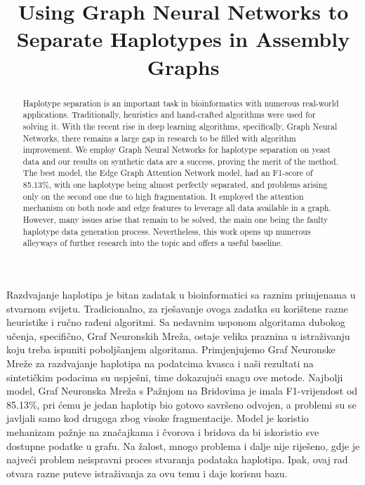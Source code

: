 \documentclass[times, utf8, diplomski, english]{fer_eng}
\begin{document}
\title{Using Graph Neural Networks to Separate Haplotypes in Assembly Graphs}
\begin{abstract}
	
Haplotype separation is an important task in bioinformatics with numerous real-world applications. Traditionally, heuristics and hand-crafted algorithms were used for solving it. With the recent rise in deep learning algorithms, specifically, Graph Neural Networks, there remains a large gap in research to be filled with algorithm improvement. We employ Graph Neural Networks for haplotype separation on yeast data and our results on synthetic data are a success, proving the merit of the method. The best model, the Edge Graph Attention Network model, had an F1-score of 85.13\%, with one haplotype being almost perfectly separated, and problems arising only on the second one due to high fragmentation. It employed the attention mechanism on both node and edge features to leverage all data available in a graph. However, many issues arise that remain to be solved, the main one being the faulty haplotype data generation process. Nevertheless, this work opens up numerous alleyways of further research into the topic and offers a useful baseline.

\end{abstract}

\begin{sazetak}
	
Razdvajanje haplotipa je bitan zadatak u bioinformatici sa raznim primjenama u stvarnom svijetu. Tradicionalno, za rješavanje ovoga zadatka su korištene razne heuristike i ručno rađeni algoritmi. Sa nedavnim usponom algoritama dubokog učenja, specifično, Graf Neuronskih Mreža, ostaje velika praznina u istraživanju koju treba ispuniti poboljšanjem algoritama. Primjenjujemo Graf Neuronske Mreže za razdvajanje haplotipa na podatcima kvasca i naši rezultati na sintetičkim podacima su uspješni, time dokazujući snagu ove metode. Najbolji model, Graf Neuronska Mreža s Pažnjom na Bridovima je imala F1-vrijendost od 85.13\%, pri ćemu je jedan haplotip bio gotovo savršeno odvojen, a problemi su se javljali samo kod drugoga zbog visoke fragmentacije. Model je koristio mehanizam pažnje na značajkama i čvorova i bridova da bi iskoristio sve dostupne podatke u grafu. Na žalost, mnogo problema i dalje nije riješeno, gdje je najveći problem neispravni proces stvaranja podataka haplotipa. Ipak, ovaj rad otvara razne puteve istraživanja za ovu temu i daje korisnu bazu.

\end{sazetak}
\end{document}

